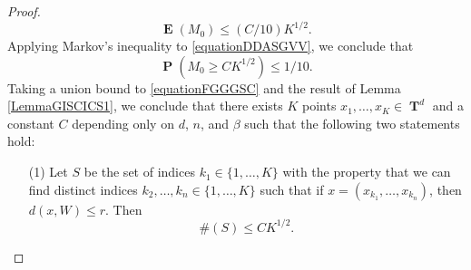\documentclass[12pt,reqno]{article}
\numberwithin{equation}{section}
\DeclareMathOperator{\TT}{\mathbf{T}}
\DeclareMathOperator{\EE}{\mathbf{E}}
\DeclareMathOperator{\PP}{\mathbf{P}}
\begin{document}
\begin{proof}
    \begin{equation} \label{equationDDASGVV}
        \EE(M_0) \leq (C/10) K^{1/2}.
    \end{equation}
    Applying Markov's inequality to \eqref{equationDDASGVV}, we conclude that
    \begin{equation} \label{equationFGGGSC}
        \PP(M_0 \geq C K^{1/2}) \leq 1/10.
    \end{equation}
    Taking a union bound to \eqref{equationFGGGSC} %
    and the result of Lemma \ref{LemmaGISCICS1}, we conclude that there exists $K$ points $x_1, \dots, x_K \in \TT^d$ and a constant $C$ depending only on $d$, $n$, and $\beta$ such that the following two statements hold:
    \begin{itemize}
        \item[(1)] Let $S$ be the set of indices $k_1 \in \{ 1, \dots, K \}$ with the property that we can find distinct indices $k_2, \dots, k_n \in \{ 1, \dots, K \}$ such that if $x = (x_{k_1}, \dots, x_{k_n})$, then $d(x, W) \leq r$. Then
        \begin{equation} \label{equationGGSC99124}
            \#(S) \leq C K^{1/2}.
        \end{equation}


\end{itemize}
\end{proof}
\end{document}
